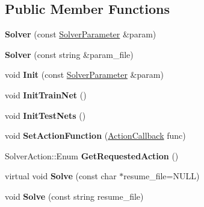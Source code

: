 \subsection*{Public Member Functions}
\begin{DoxyCompactItemize}
\item 
\mbox{\label{classcaffe_1_1_solver_a153266a021a077d1e4b53819cf558780}} 
{\bfseries Solver} (const \mbox{\hyperlink{classcaffe_1_1_solver_parameter}{Solver\+Parameter}} \&param)
\item 
\mbox{\label{classcaffe_1_1_solver_a8dea449cb5198e44b1ad975943ec0d64}} 
{\bfseries Solver} (const string \&param\+\_\+file)
\item 
\mbox{\label{classcaffe_1_1_solver_abf3071597032efde211e5b48cdcb99c5}} 
void {\bfseries Init} (const \mbox{\hyperlink{classcaffe_1_1_solver_parameter}{Solver\+Parameter}} \&param)
\item 
\mbox{\label{classcaffe_1_1_solver_a12e2bc3f5747c5e983f11d6c1dbe1256}} 
void {\bfseries Init\+Train\+Net} ()
\item 
\mbox{\label{classcaffe_1_1_solver_a41e4eff217da272aa8dbc6f0d3bdd289}} 
void {\bfseries Init\+Test\+Nets} ()
\item 
\mbox{\label{classcaffe_1_1_solver_a4a90f66f516b986e873211fcbe340348}} 
void {\bfseries Set\+Action\+Function} (\mbox{\hyperlink{namespacecaffe_a117e25cc445c0d716517761a0fbc6daf}{Action\+Callback}} func)
\item 
\mbox{\label{classcaffe_1_1_solver_af31b33df3dd3ea3b689839c8cb2ed29e}} 
Solver\+Action\+::\+Enum {\bfseries Get\+Requested\+Action} ()
\item 
\mbox{\label{classcaffe_1_1_solver_a20db89c708755c9a1e150df9d0a4b79c}} 
virtual void {\bfseries Solve} (const char $\ast$resume\+\_\+file=N\+U\+LL)
\item 
\mbox{\label{classcaffe_1_1_solver_ac0be56a22aebd71d012e751c9e97c7e6}} 
void {\bfseries Solve} (const string resume\+\_\+file)

\end{DoxyCompactItemize}
